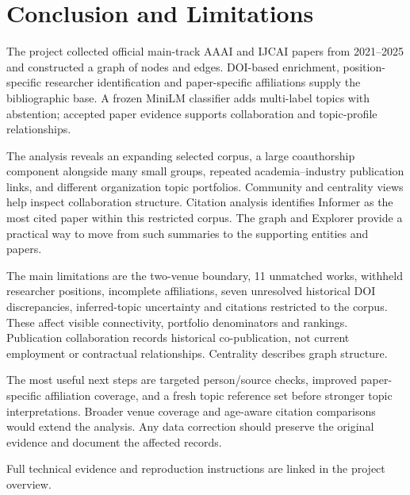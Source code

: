 \chapter{Conclusion and Limitations}
The project collected \Papers{} official main-track AAAI and IJCAI papers from
2021--2025 and constructed a graph of \TotalNodes{} nodes and
\TotalEdges{} edges. DOI-based enrichment, position-specific researcher
identification and paper-specific affiliations supply the bibliographic base.
A frozen MiniLM classifier adds multi-label topics with abstention; accepted
paper evidence supports collaboration and topic-profile relationships.

The analysis reveals an expanding selected corpus, a large coauthorship component
alongside many small groups, repeated academia--industry publication links,
and different organization topic portfolios. Community and centrality views
help inspect collaboration structure. Citation analysis identifies Informer as
the most cited paper within this restricted corpus. The graph and Explorer
provide a practical way to move from such summaries to the supporting entities
and papers.

The main limitations are the two-venue boundary, 11 unmatched works, withheld
researcher positions, incomplete affiliations, seven unresolved historical DOI
discrepancies, inferred-topic uncertainty and citations restricted to the corpus.
These affect visible connectivity, portfolio denominators and rankings.
Publication collaboration records historical co-publication, not current
employment or contractual relationships. Centrality describes graph structure.

The most useful next steps are targeted person/source checks, improved
paper-specific affiliation coverage, and a fresh topic reference set before
stronger topic interpretations. Broader venue coverage and age-aware citation
comparisons would extend the analysis. Any data correction should preserve
the original evidence and document the affected records.

Full technical evidence and reproduction instructions are linked in the project overview.
